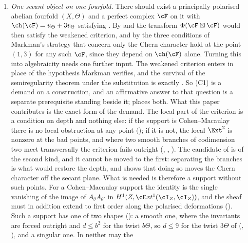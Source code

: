 \begin{enumerate}[label=\textup{(C\arabic*)},leftmargin=3.0em,itemsep=4pt]
\item \emph{One secant object on one fourfold.} There should exist a
  principally polarised abelian fourfold $(X,\Theta)$ and a perfect complex
  $\cF$ on it with $\ch(\cF)=u_{\Theta}+3v_{\Theta}$ satisfying
  \cite[(19)]{paperII}. By \cite[Theorem~4.56]{paperII} and \cite[Corollary~4.57]{paperII}
  the transform $\Phi(\cF\boxtimes\cF)$ would then satisfy the weakened
  criterion, and by \cite[Proposition~4.52]{paperII} the three conditions of Markman's
  strategy that concern only the Chern character hold at the point $(1,3)$
  for any such $\cF$, since they depend on $\ch(\cF)$ alone. Turning this
  into algebraicity needs one further input. The weakened criterion enters
  in place of the hypothesis Markman verifies, and the survival of the
  semiregularity theorem under the substitution is exactly
  \cite[Question 11.4]{Mar25b}. So (C1) is a demand on a construction, and an affirmative answer to
  that question is a separate prerequisite standing beside it;
   places both. What this paper contributes is the exact
  form of the demand. The local part of the criterion is a condition on depth
  and nothing else: if the support is Cohen--Macaulay there is no local
  obstruction at any point (\cite[Theorem~4.75]{paperII}); if it is not, the local
  $\Ext^{2}$ is nonzero at the bad points, and where two smooth branches of
  codimension two meet transversally the criterion fails outright
  (\cite[Theorem~4.61]{paperII}, \cite[Corollary~4.63]{paperII},
  \cite[Corollary~4.77]{paperII}). The candidate of
  \cite[Section 12]{Mar25b} is of the second kind, and it cannot be moved to
  the first: separating the branches is what would restore the depth, and
  \cite[Remark~4.78]{paperII} shows that doing so moves the Chern character
  off the secant plane. What is needed is therefore a support without such
  points. For a Cohen--Macaulay support the identity \cite[(19)]{paperII}
  is the single vanishing of the image of $A_{\theta}A_{\theta'}$ in
  $H^{1}(Z,\cE xt^{1}(\cI_{Z},\cI_{Z}))$, and the sheaf must in addition
  extend to first order along the polarised deformations
  (\cite[Theorem~4.56(iii)]{paperII}). Such a support has one of two
  shapes (\cite[Corollary~4.94]{paperII}): a smooth one, where the invariants are forced
  outright and $d\le b^{2}$ for the twist $b\Theta$, so $d\le9$ for the twist
  $3\Theta$ of \cite[Setup~4.51]{paperII} (\cite[Theorem~4.67]{paperII},
  \cite[Corollary~4.68]{paperII}), and a singular one. In neither may the

\end{enumerate}
